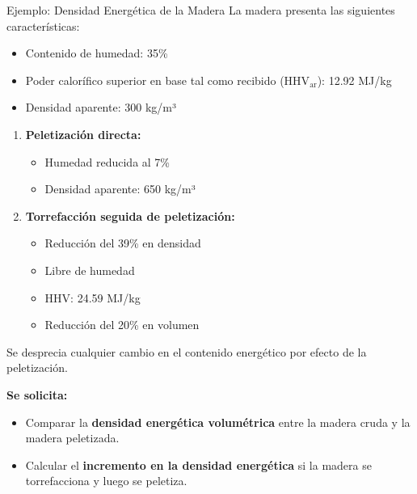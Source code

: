 \documentclass[main.tex]{subfiles}
\begin{document}
\begin{frame}{Ejemplo: Densidad Energética de la Madera}
La madera presenta las siguientes características: \\
\begin{itemize}
    \item Contenido de humedad: 35\%
    \item Poder calorífico superior en base tal como recibido (HHV$_{\text{ar}}$): 12.92 MJ/kg
    \item Densidad aparente: 300 kg/m³
\end{itemize}
\begin{enumerate}
    \item \textbf{Peletización directa:}
    \begin{itemize}
        \item Humedad reducida al 7\%
        \item Densidad aparente: 650 kg/m³
    \end{itemize}
    \item \textbf{Torrefacción seguida de peletización:}
    \begin{itemize}
        \item Reducción del 39\% en densidad
        \item Libre de humedad
        \item HHV: 24.59 MJ/kg
        \item Reducción del 20\% en volumen
    \end{itemize}
\end{enumerate}

\end{frame}

\begin{frame}

Se desprecia cualquier cambio en el contenido energético por efecto de la peletización.

\vspace{0.3cm}
\textbf{Se solicita:}
\begin{itemize}
    \item[a)] Comparar la \textbf{densidad energética volumétrica} entre la madera cruda y la madera peletizada.
    \item[b)] Calcular el \textbf{incremento en la densidad energética} si la madera se torrefacciona y luego se peletiza.
\end{itemize}
    
\end{frame}
\end{document}
